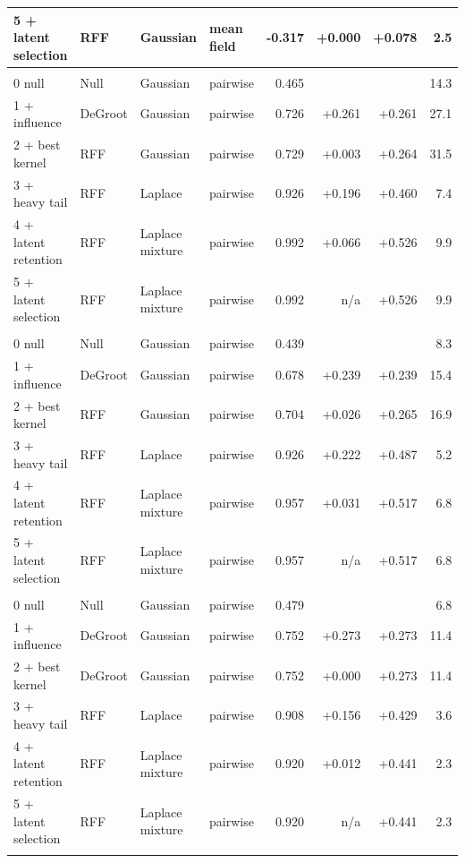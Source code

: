 \begin{longtable}{llllrrrr}
5 + latent selection & RFF & Gaussian & mean field & -0.317 & +0.000 & +0.078 & 2.5 \\
\midrule
\multicolumn{8}{l}{\takacs{}} \\
0 null & Null & Gaussian & pairwise & 0.465 &  &  & 14.3 \\
1 + influence & DeGroot & Gaussian & pairwise & 0.726 & +0.261 & +0.261 & 27.1 \\
2 + best kernel & RFF & Gaussian & pairwise & 0.729 & +0.003 & +0.264 & 31.5 \\
3 + heavy tail & RFF & Laplace & pairwise & 0.926 & +0.196 & +0.460 & 7.4 \\
4 + latent retention & RFF & Laplace mixture & pairwise & 0.992 & +0.066 & +0.526 & 9.9 \\
5 + latent selection & RFF & Laplace mixture & pairwise & 0.992 & n/a & +0.526 & 9.9 \\
\midrule
\multicolumn{8}{l}{\takacsCtl{}} \\
0 null & Null & Gaussian & pairwise & 0.439 &  &  & 8.3 \\
1 + influence & DeGroot & Gaussian & pairwise & 0.678 & +0.239 & +0.239 & 15.4 \\
2 + best kernel & RFF & Gaussian & pairwise & 0.704 & +0.026 & +0.265 & 16.9 \\
3 + heavy tail & RFF & Laplace & pairwise & 0.926 & +0.222 & +0.487 & 5.2 \\
4 + latent retention & RFF & Laplace mixture & pairwise & 0.957 & +0.031 & +0.517 & 6.8 \\
5 + latent selection & RFF & Laplace mixture & pairwise & 0.957 & n/a & +0.517 & 6.8 \\
\midrule
\multicolumn{8}{l}{\takacsDis{}} \\
0 null & Null & Gaussian & pairwise & 0.479 &  &  & 6.8 \\
1 + influence & DeGroot & Gaussian & pairwise & 0.752 & +0.273 & +0.273 & 11.4 \\
2 + best kernel & DeGroot & Gaussian & pairwise & 0.752 & +0.000 & +0.273 & 11.4 \\
3 + heavy tail & RFF & Laplace & pairwise & 0.908 & +0.156 & +0.429 & 3.6 \\
4 + latent retention & RFF & Laplace mixture & pairwise & 0.920 & +0.012 & +0.441 & 2.3 \\
5 + latent selection & RFF & Laplace mixture & pairwise & 0.920 & n/a & +0.441 & 2.3 \\
\midrule
\multicolumn{8}{l}{\takacsInt{}} \\

\end{longtable}
